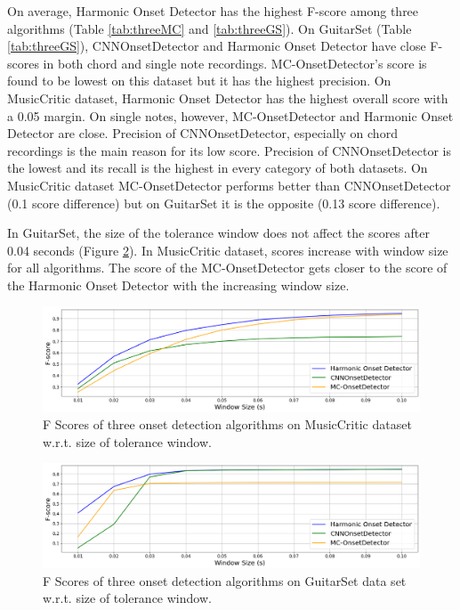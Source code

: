 On average, Harmonic Onset Detector has the highest F-score among three algorithms (Table \ref{tab:threeMC} and \ref{tab:threeGS}). On GuitarSet (Table \ref{tab:threeGS}), CNNOnsetDetector and Harmonic Onset Detector have close F-scores in both chord and single note recordings. MC-OnsetDetector's score is found to be lowest on this dataset but it has the highest precision. On MusicCritic dataset, Harmonic Onset Detector has the highest overall score with a 0.05 margin. On single notes, however, MC-OnsetDetector and Harmonic Onset Detector are close. Precision of CNNOnsetDetector, especially on chord recordings is the main reason for its low score. Precision of CNNOnsetDetector is the lowest and its recall is the highest in every category of both datasets. On MusicCritic dataset MC-OnsetDetector performs better than CNNOnsetDetector (0.1 score difference) but on GuitarSet it is the opposite (0.13 score difference).

In GuitarSet, the size of the tolerance window does not affect the scores after 0.04 seconds (Figure \ref{fig:wsize_gs}). In MusicCritic dataset, scores increase with window size for all algorithms. The score of the MC-OnsetDetector gets closer to the score of the Harmonic Onset Detector with the increasing window size. 

\begin{figure}
    \centering
    \includegraphics[width=\columnwidth]{results/mcwindowsize.png}
    \caption{F Scores of three onset detection algorithms on MusicCritic dataset w.r.t. size of tolerance window.}
    \label{fig:wsize_mc}
\end{figure}

\begin{figure}
    \centering
    \includegraphics[width=\columnwidth]{results/gswindowsize.png}
    \caption{F Scores of three onset detection algorithms on GuitarSet data set w.r.t. size of tolerance window.}
    \label{fig:wsize_gs}
\end{figure}

